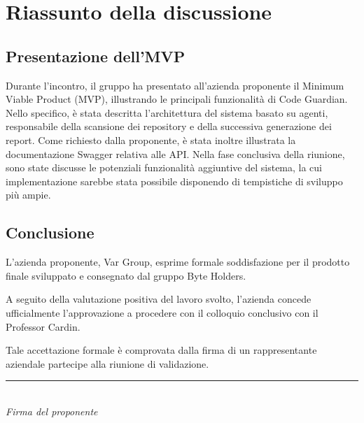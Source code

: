 \documentclass[a4paper, 11pt]{article}
\begin{document}
\newpage

\section{Riassunto della discussione}

\subsection{Presentazione dell'MVP}
Durante l'incontro, il gruppo ha presentato all'azienda proponente il Minimum Viable Product (MVP), illustrando le principali funzionalità di Code Guardian. Nello specifico, è stata descritta l'architettura del sistema basato su agenti, responsabile della scansione dei repository e della successiva generazione dei report. Come richiesto dalla proponente, è stata inoltre illustrata la documentazione Swagger relativa alle API. Nella fase conclusiva della riunione, sono state discusse le potenziali funzionalità aggiuntive del sistema, la cui implementazione sarebbe stata possibile disponendo di tempistiche di sviluppo più ampie.
\subsection{Conclusione}
L'azienda proponente, Var Group, esprime formale soddisfazione per il prodotto finale sviluppato e consegnato dal gruppo Byte Holders.

A seguito della valutazione positiva del lavoro svolto, l'azienda concede ufficialmente l'approvazione a procedere con il colloquio conclusivo con il Professor Cardin.

Tale accettazione formale è comprovata dalla firma di un rappresentante aziendale partecipe alla riunione di validazione.
\begin{center}
    \vspace{1.5cm}
    \rule{6cm}{0.4pt}\\
    \textit{Firma del proponente}
\end{center}
\end{document}
